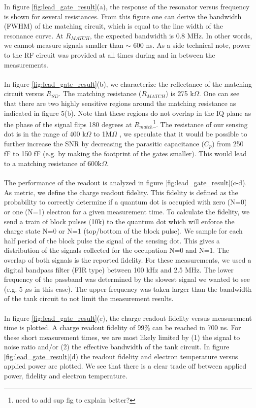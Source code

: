 \documentclass{article}
\begin{document}
In figure \ref{fig:lead_gate_result}(a), the response of the resonator versus frequency is shown for several resistances. From this figure one can derive the bandwidth (FWHM) of the matching circuit, which is equal to the line width of the resonance curve. At $R_{MATCH}$, the expected bandwidth is 0.8 MHz. In other words, we cannot measure signals smaller than $\sim$ 600 ns. As a side technical note, power to the RF circuit was provided at all times during and in between the measurements.
\\ \\
In figure \ref{fig:lead_gate_result}(b), we characterize the reflectance of the matching circuit versus $R_{SD}$. The matching resistance ($R_{MATCH}$) is 275 k$\Omega$. One can see that there are two highly sensitive regions around the matching resistance as indicated in figure 5(b). Note that these regions do not overlap in the IQ plane as the phase of the signal flips 180 degrees at $R_{match}$\footnote{need to add sup fig to explain better?}. 
The resistance of our sensing dot is in the range of 400 k$\Omega$ to 1M$\Omega$ , we speculate that it would be possible to further increase the SNR by decreasing the parasitic capacitance ($C_p$) from 250 fF to 150 fF (e.g. by making the footprint of the gates smaller). This would lead to a matching resistance of 600k$\Omega$.
\\ \\
The performance of the readout is analyzed in figure \ref{fig:lead_gate_result}(c-d). As metric, we define the charge readout fidelity. This fidelity is defined as the probability to correctly determine if a quantum dot is occupied with zero (N=0) or one (N=1) electron for a given measurement time. To calculate the fidelity, we send a train of block pulses (10k) to the quantum dot which will enforce the charge state N=0 or N=1 (top/bottom of the block pulse). We sample for each half period of the block pulse the signal of the sensing dot. This gives a distribution of the signals collected for the occupation N=0 and N=1. The overlap of both signals is the reported fidelity. For these measurements, we used a digital bandpass filter (FIR type) between 100 kHz and 2.5 MHz. The lower frequency of the passband was determined by the slowest signal we wanted to see (e.g. 5 $\mu$s in this case). The upper frequency was taken larger than the bandwidth of the tank circuit to not limit the measurement results.
\\ \\
In figure \ref{fig:lead_gate_result}(c), the charge readout fidelity versus measurement time is plotted. A charge readout fidelity of 99\% can be reached in 700 ns. For these short measurement times, we are most likely limited by (1) the signal to noise ratio and/or (2) the effective bandwidth of the tank circuit. In figure \ref{fig:lead_gate_result}(d) the readout fidelity and electron temperature versus applied power are plotted. We see that there is a clear trade off between applied power, fidelity and electron temperature.  
\end{document}
